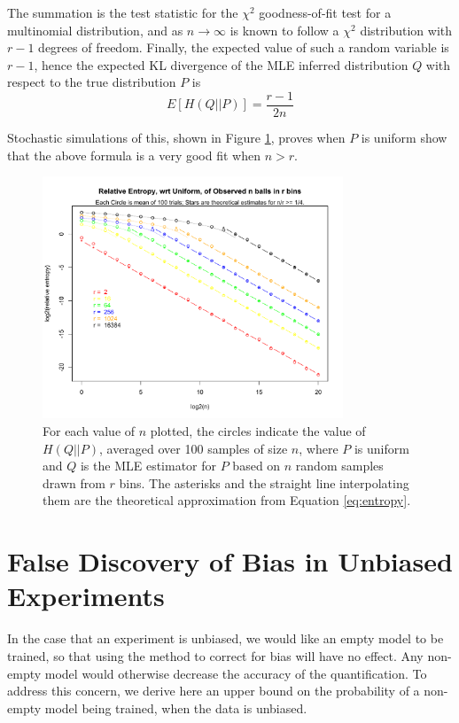 \documentclass[letterpaper]{article}
\begin{document}
The summation is the test statistic for the $\chi^2$ goodness-of-fit test for a
multinomial distribution, and as $n \rightarrow \infty$ is known to follow a
$\chi^2$ distribution with $r - 1$ degrees of freedom. Finally, the expected
value of such a random variable is $r - 1$, hence the expected KL divergence of
the MLE inferred distribution $Q$ with respect to the true distribution $P$ is
\begin{equation}
\label{eq:entropy}
E[H(Q||P)] = \frac{r - 1}{2n}
\end{equation}

Stochastic simulations of this, shown in Figure \ref{fig:entropy}, proves when
$P$ is uniform show that the above formula is a very good fit when $n > r$.

\begin{figure}[H]
\centerline{\includegraphics[width=0.8\textwidth]{fig/entropy.pdf}}
\caption{For each value of $n$ plotted, the circles indicate the value of
$H(Q||P)$, averaged over 100 samples of size $n$, where $P$ is uniform and $Q$
is the MLE estimator for $P$ based on $n$ random samples drawn from $r$ bins.
The asterisks and the straight line interpolating them are the theoretical
approximation from Equation \ref{eq:entropy}.
}
\label{fig:entropy}
\end{figure}

\section{False Discovery of Bias in Unbiased Experiments}

In the case that an experiment is unbiased, we would like an empty model to be
trained, so that using the method to correct for bias will have no effect. Any
non-empty model would otherwise decrease the accuracy of the quantification. To
address this concern, we derive here an upper bound on the probability of a
non-empty model being trained, when the data is unbiased.
\end{document}
